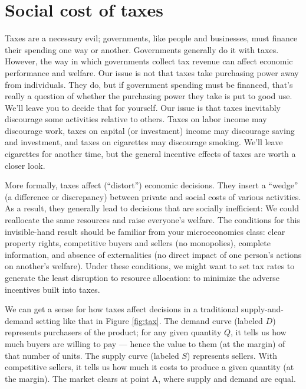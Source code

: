 \section{Social cost of taxes}
\label{sec:triangle}

Taxes are a necessary evil;
governments, like people and businesses,
must finance their spending one way or another.
Governments generally do it with taxes.
However, the way in which governments collect tax revenue
can affect economic performance and welfare.
Our issue is not that taxes take purchasing power
away from individuals.
They do, but if government spending must be financed,
that's really a question of whether the purchasing power they take is put to good use.
We'll leave you to decide that for yourself.
Our issue is that taxes inevitably
discourage some activities relative to others.
Taxes on labor income may discourage work,
taxes on capital (or investment) income may discourage saving and investment,
and taxes on cigarettes may discourage smoking.
We'll leave cigarettes for another time,
but the general incentive effects of taxes are worth a closer look.

More formally,
taxes affect (``distort'') economic decisions.
They insert a ``wedge''   (a difference or discrepancy) between
private and social costs of various activities.
As a result, they generally lead to decisions that are socially inefficient:
We could reallocate the same resources and raise everyone's welfare.
The conditions for this invisible-hand result should be
familiar from your microeconomics class:
clear property rights,
competitive buyers and sellers (no monopolies),
complete information,
and absence of externalities
(no direct impact of one person's actions on another's welfare).
Under these conditions,
we might want to set tax rates
to generate the least disruption to resource allocation:
to minimize the adverse incentives built into taxes.

We can get a sense for how taxes affect decisions 
in a traditional supply-and-demand setting like that
in Figure \ref{fig:tax}.
The demand curve (labeled $D$) represents purchasers of the product;
for any given quantity $Q$, it tells us how much buyers are willing to
pay --- hence the value to them (at the margin) of that number of units.
The supply curve (labeled $S$) represents sellers.
With competitive sellers, it tells us how much it costs to produce
a given quantity (at the margin).
The market clears at point A, where supply and demand are equal.

